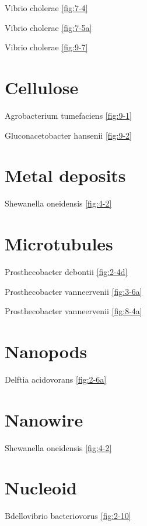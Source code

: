 \documentclass[]{tufte-book}
\begin{document}
Vibrio cholerae \ref{fig:7-4}

Vibrio cholerae \ref{fig:7-5a}

Vibrio cholerae \ref{fig:9-7}

\section*{Cellulose}\label{cellulose-1}

Agrobacterium tumefaciens \ref{fig:9-1}

Gluconacetobacter hansenii \ref{fig:9-2}

\section*{Metal deposits}\label{metal-deposits}

Shewanella oneidensis \ref{fig:4-2}

\section*{Microtubules}\label{microtubules}

Prosthecobacter debontii \ref{fig:2-4d}

Prosthecobacter vanneervenii \ref{fig:3-6a}

Prosthecobacter vanneervenii \ref{fig:8-4a}

\section*{Nanopods}\label{nanopods}

Delftia acidovorans \ref{fig:2-6a}

\section*{Nanowire}\label{nanowire}

Shewanella oneidensis \ref{fig:4-2}

\section*{Nucleoid}\label{nucleoid}

Bdellovibrio bacteriovorus \ref{fig:2-10}
\end{document}
